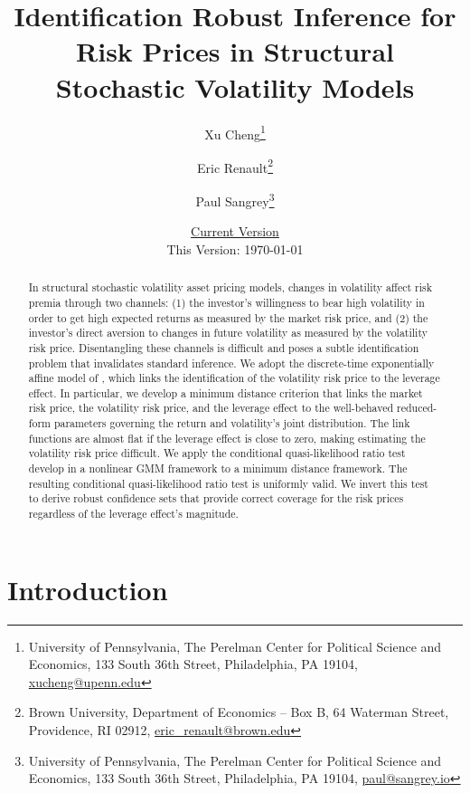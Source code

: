 \documentclass[11pt, letterpaper, twoside]{article}
\author{Xu Cheng\thanks{University of Pennsylvania, The Perelman Center for Political Science and Economics, 133 South 36th Street, Philadelphia, PA 19104, \href{mailto:xucheng@upenn.edu}{xucheng@upenn.edu}} \and Eric Renault\thanks{Brown University, Department of Economics -- Box B, 64 Waterman Street, Providence, RI 02912, \href{mailto:eric_renault@brown.edu}{eric\_renault@brown.edu}} \and Paul Sangrey\thanks{University of Pennsylvania, The Perelman Center for Political Science and Economics, 133 South 36th Street, Philadelphia, PA 19104, \href{mailto:paul@sangrey.io}{paul@sangrey.io}}}
\title{Identification Robust Inference for Risk Prices in Structural Stochastic Volatility Models}
\date{\href{http://sangrey.io/risk_price_inference.pdf}{Current Version} \protect\\ This Version: \today}
\begin{document}
\begin{titlepage}


\maketitle
\thispagestyle{empty}
\addtocounter{page}{-1}

\begin{abstract} 

\singlespacing \noindent 
In structural stochastic volatility asset pricing models, changes in volatility affect risk premia through two channels: (1) the investor's willingness to bear high volatility in order to get high expected returns as measured by the market risk price, and (2) the investor’s direct aversion to changes in future volatility as measured by the volatility risk price. Disentangling these channels is difficult and poses a subtle identification problem that invalidates standard inference. We adopt the discrete-time exponentially affine model of \textcite{han2018leverage}, which links the identification of the volatility risk price to the leverage effect. In particular, we develop a minimum distance criterion that links the market risk price, the volatility risk price, and the leverage effect to the well-behaved reduced-form parameters governing the return and volatility's joint distribution. The link functions are almost flat if the leverage effect is close to zero, making estimating the volatility risk price difficult. We apply the conditional quasi-likelihood ratio test \textcite{andrews2016conditional} develop in a nonlinear GMM framework to a minimum distance framework. The resulting conditional quasi-likelihood ratio test is uniformly valid. We invert this test to derive robust confidence sets that provide correct coverage for the risk prices regardless of the leverage effect's magnitude. 

\end{abstract} 

\medskip
{}

\medskip


\end{titlepage}

\clearpage

\section{Introduction}
\end{document}
